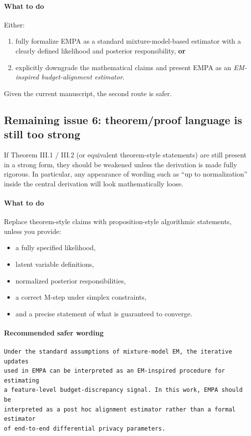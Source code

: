 \documentclass[11pt]{article}
\begin{document}
\paragraph{What to do}
Either:
\begin{enumerate}
    \item fully formalize EMPA as a standard mixture-model-based estimator with a clearly defined likelihood and posterior responsibility, \textbf{or}
    \item explicitly downgrade the mathematical claims and present EMPA as an \emph{EM-inspired budget-alignment estimator}.
\end{enumerate}

Given the current manuscript, the second route is safer.

\subsection*{Remaining issue 6: theorem/proof language is still too strong}
If Theorem III.1 / III.2 (or equivalent theorem-style statements) are still present in a strong form, they should be weakened unless the derivation is made fully rigorous. In particular, any appearance of wording such as ``up to normalization'' inside the central derivation will look mathematically loose.

\paragraph{What to do}
Replace theorem-style claims with proposition-style algorithmic statements, unless you provide:
\begin{itemize}
    \item a fully specified likelihood,
    \item latent variable definitions,
    \item normalized posterior responsibilities,
    \item a correct M-step under simplex constraints,
    \item and a precise statement of what is guaranteed to converge.
\end{itemize}

\paragraph{Recommended safer wording}
\begin{verbatim}
Under the standard assumptions of mixture-model EM, the iterative updates
used in EMPA can be interpreted as an EM-inspired procedure for estimating
a feature-level budget-discrepancy signal. In this work, EMPA should be
interpreted as a post hoc alignment estimator rather than a formal estimator
of end-to-end differential privacy parameters.
\end{verbatim}
\end{document}
